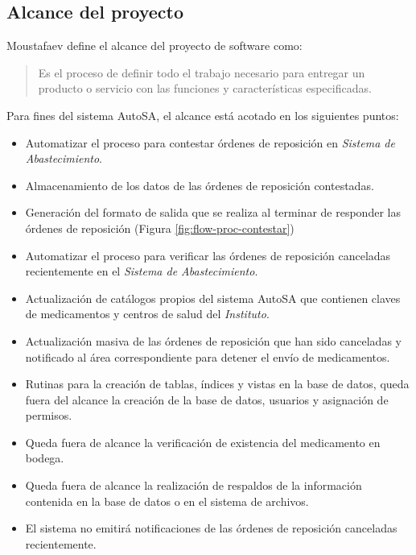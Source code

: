 \subsection{Alcance del proyecto}\label{sec:alcance}
Moustafaev\cite{ScopeManagement} define el alcance del proyecto de software como:
\begin{quote}
Es el proceso de definir todo el trabajo necesario para entregar un producto o servicio con las funciones y características especificadas.
\end{quote}
Para fines del sistema AutoSA, el alcance está acotado en los siguientes puntos:
\begin{itemize}
\item Automatizar el proceso para contestar órdenes de reposición en \textit{Sistema de Abastecimiento}.
\item Almacenamiento de los datos de las órdenes de reposición contestadas.
\item Generación del formato de salida que se realiza al terminar de responder las órdenes de reposición (Figura \ref{fig:flow-proc-contestar})
\item Automatizar el proceso para verificar las órdenes de reposición canceladas recientemente en el \textit{Sistema de Abastecimiento}.
\item Actualización de catálogos propios del sistema AutoSA que contienen claves de medicamentos y centros de salud del \textit{Instituto}.
\item Actualización masiva de las órdenes de reposición que han sido canceladas y notificado al área correspondiente para detener el envío de medicamentos.
\item Rutinas para la creación de tablas, índices y vistas en la base de datos, queda fuera del alcance la creación de la base de datos, usuarios y asignación de permisos. 
\item Queda fuera de alcance la verificación de existencia del medicamento en bodega.
\item Queda fuera de alcance la realización de respaldos de la información contenida en la base de datos o en el sistema de archivos.
\item El sistema no emitirá notificaciones de las órdenes de reposición canceladas recientemente.
\end{itemize}


